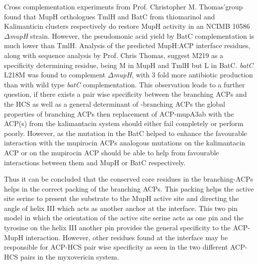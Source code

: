 Cross complementation experiments from Prof. Christopher M. Thomas\textquoteright group found that MupH orthologues TmlH and BatC from thiomarinol and Kalimanticin clusters respectively do restore MupH activity in an NCIMB 10586 $ \Delta $\textit{mupH} strain. However, the pseudomonic acid yield by BatC complementation is much lower than TmlH. Analysis of the predicted MupH:ACP interface residues, along with sequence analysis by Prof. Chris Thomas, suggest M219 as a specificity determining residue, being M in MupH and TmlH but L in BatC. \textit{batC} L218M was found to complement $ \Delta $\textit{mupH}, with 3 fold more antibiotic production than with wild type \textit{batC} complementation. This observation leads to a further question, if there exists a pair wise specificity between the branching ACPs and the HCS as well as a general determinant of \bet-branching ACPs the global properties of branching ACPs then replacement of ACP-mupA3ab with the ACP(s) from the kalimantacin system should either fail completely or perform poorly. However, as the mutation in the BatC helped to enhance the favourable interaction with the mupirocin ACPs analogous mutations on the kalimantacin ACP or on the mupirocin ACP should be able to help from favourable interactions between them and MupH or BatC respectively. 

Thus it can be concluded that the conserved core residues in the branching-ACPs helps in the correct packing of the branching ACPs. This packing helps the active site serine to present the substrate to the MupH active site and directing the angle of helix III which acts as another anchor at the interface. This two pin model in which the orientation of the active site serine acts as one pin and the tyrosine on the helix III another pin provides the general specificity to the ACP-MupH interaction. However, other residues found at the interface may be responsible for ACP-HCS pair wise specificity as seen in the two different ACP-HCS pairs in the myxovericin system. 











	

	
	

